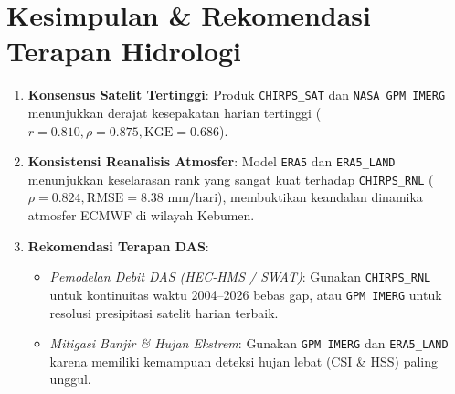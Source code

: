 \documentclass[11pt,a4paper]{article}
\begin{document}
\section{Kesimpulan \& Rekomendasi Terapan Hidrologi}
\begin{enumerate}[leftmargin=*]
    \item \textbf{Konsensus Satelit Tertinggi}: Produk \texttt{CHIRPS\_SAT} dan \texttt{NASA GPM IMERG} menunjukkan derajat kesepakatan harian tertinggi ($r = 0.810, \rho = 0.875, \text{KGE} = 0.686$).
    \item \textbf{Konsistensi Reanalisis Atmosfer}: Model \texttt{ERA5} dan \texttt{ERA5\_LAND} menunjukkan keselarasan rank yang sangat kuat terhadap \texttt{CHIRPS\_RNL} ($\rho = 0.824, \text{RMSE} = 8.38\text{ mm/hari}$), membuktikan keandalan dinamika atmosfer ECMWF di wilayah Kebumen.
    \item \textbf{Rekomendasi Terapan DAS}:
    \begin{itemize}
        \item \textit{Pemodelan Debit DAS (HEC-HMS / SWAT)}: Gunakan \texttt{CHIRPS\_RNL} untuk kontinuitas waktu 2004–2026 bebas gap, atau \texttt{GPM IMERG} untuk resolusi presipitasi satelit harian terbaik.
        \item \textit{Mitigasi Banjir \& Hujan Ekstrem}: Gunakan \texttt{GPM IMERG} dan \texttt{ERA5\_LAND} karena memiliki kemampuan deteksi hujan lebat (CSI \& HSS) paling unggul.
    \end{itemize}
\end{enumerate}
\end{document}
